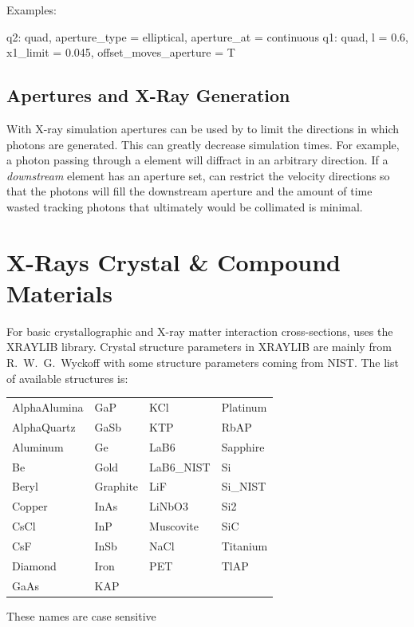 Examples:
\begin{example}
  q2: quad, aperture_type = elliptical, aperture_at = continuous
  q1: quad, l = 0.6, x1_limit = 0.045, offset_moves_aperture = T
\end{example}

\subsection{Apertures and X-Ray Generation}
\label{s:aper.x.ray}

With X-ray simulation apertures can be used by \bmad to limit the
directions in which photons are generated. This can greatly decrease
simulation times. For example, a photon passing through a
 element will diffract in an arbitrary
direction. If a {\em downstream} element has an aperture set, \bmad
can restrict the velocity directions so that the photons will fill the
downstream aperture and the amount of time wasted tracking photons
that ultimately would be collimated is minimal.

\section{X-Rays Crystal \& Compound Materials}
\label{s:cryst.list}

For basic crystallographic and X-ray matter interaction cross-sections,
\bmad uses the XRAYLIB\cite{b:xraylib} library. Crystal structure
parameters in XRAYLIB are mainly from R.~W.~G.~Wyckoff\cite{b:wyckoff}
with some structure parameters coming from NIST. The list of available
structures is:
\begin{center}
\begin{tabular}{llll} \toprule
AlphaAlumina & GaP       & KCl        & Platinum  \\
AlphaQuartz  & GaSb      & KTP        & RbAP      \\
Aluminum     & Ge        & LaB6       & Sapphire  \\
Be           & Gold      & LaB6_NIST  & Si        \\
Beryl        & Graphite  & LiF        & Si_NIST   \\
Copper       & InAs      & LiNbO3     & Si2       \\
CsCl         & InP       & Muscovite  & SiC       \\
CsF          & InSb      & NaCl       & Titanium  \\
Diamond      & Iron      & PET        & TlAP      \\
GaAs         & KAP       &            &           \\ \bottomrule
\end{tabular}
\end{center}
These names are case sensitive

